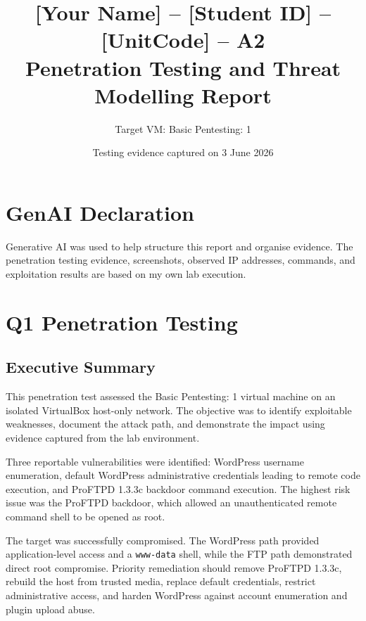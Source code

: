 \documentclass[11pt,a4paper]{article}
\title{\textbf{[Your Name] -- [Student ID] -- [UnitCode] -- A2}\\
\large Penetration Testing and Threat Modelling Report}
\author{Target VM: Basic Pentesting: 1}
\date{Testing evidence captured on 3 June 2026}
\begin{document}
\maketitle

\section*{GenAI Declaration}
Generative AI was used to help structure this report and organise evidence. The penetration testing evidence, screenshots, observed IP addresses, commands, and exploitation results are based on my own lab execution.

\newpage
\section{Q1 Penetration Testing}

\subsection{Executive Summary}
This penetration test assessed the Basic Pentesting: 1 virtual machine on an isolated VirtualBox host-only network. The objective was to identify exploitable weaknesses, document the attack path, and demonstrate the impact using evidence captured from the lab environment.

Three reportable vulnerabilities were identified: WordPress username enumeration, default WordPress administrative credentials leading to remote code execution, and ProFTPD 1.3.3c backdoor command execution. The highest risk issue was the ProFTPD backdoor, which allowed an unauthenticated remote command shell to be opened as root.

The target was successfully compromised. The WordPress path provided application-level access and a \texttt{www-data} shell, while the FTP path demonstrated direct root compromise. Priority remediation should remove ProFTPD 1.3.3c, rebuild the host from trusted media, replace default credentials, restrict administrative access, and harden WordPress against account enumeration and plugin upload abuse.
\end{document}

